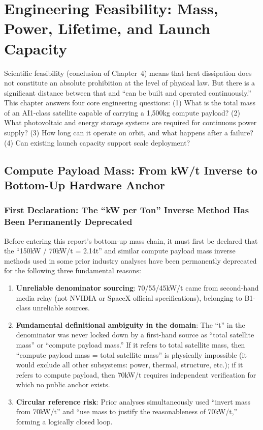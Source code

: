 
\section{Engineering Feasibility: Mass, Power, Lifetime, and Launch Capacity}

Scientific feasibility (conclusion of Chapter~4) means that heat dissipation does not constitute an absolute prohibition at the level of physical law. But there is a significant distance between that and ``can be built and operated continuously.'' This chapter answers four core engineering questions: (1) What is the total mass of an AI1-class satellite capable of carrying a 1,500\;kg compute payload? (2) What photovoltaic and energy storage systems are required for continuous power supply? (3) How long can it operate on orbit, and what happens after a failure? (4) Can existing launch capacity support scale deployment?

\subsection{Compute Payload Mass: From kW/t Inverse to Bottom-Up Hardware Anchor}

\subsubsection{First Declaration: The ``kW per Ton'' Inverse Method Has Been Permanently Deprecated}

Before entering this report's bottom-up mass chain, it must first be declared that the ``150\;kW / 70\;kW/t = 2.14\;t'' and similar compute payload mass inverse methods used in some prior industry analyses have been permanently deprecated for the following three fundamental reasons:

\begin{enumerate}
    \item \textbf{Unreliable denominator sourcing}: 70/55/45\;kW/t came from second-hand media relay (not NVIDIA or SpaceX official specifications), belonging to B1-class unreliable sources.
    \item \textbf{Fundamental definitional ambiguity in the domain}: The ``t'' in the denominator was never locked down by a first-hand source as ``total satellite mass'' or ``compute payload mass.'' If it refers to total satellite mass, then ``compute payload mass = total satellite mass'' is physically impossible (it would exclude all other subsystems: power, thermal, structure, etc.); if it refers to compute payload, then 70\;kW/t requires independent verification for which no public anchor exists.
    \item \textbf{Circular reference risk}: Prior analyses simultaneously used ``invert mass from 70\;kW/t'' and ``use mass to justify the reasonableness of 70\;kW/t,'' forming a logically closed loop.
\end{enumerate}

